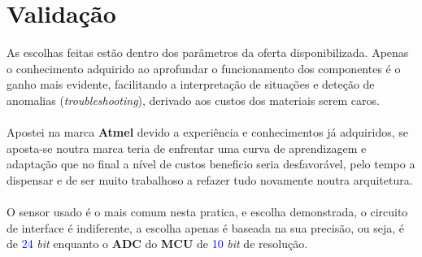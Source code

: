 \section{Validação}
As escolhas feitas estão dentro dos parâmetros da oferta disponibilizada. Apenas o conhecimento adquirido ao aprofundar o funcionamento dos componentes é o ganho mais evidente, facilitando a interpretação de situações e deteção de anomalias (\textit{troubleshooting}), derivado aos custos dos materiais serem caros.
\\
\\
Apostei na marca \textbf{Atmel} devido a experiência e conhecimentos já adquiridos, se aposta-se noutra marca teria de enfrentar uma curva de aprendizagem e adaptação que no final a nível de custos beneficio seria desfavorável, pelo tempo a dispensar e de ser muito trabalhoso a refazer tudo novamente noutra arquitetura.
\\
\\
O sensor usado é o mais comum nesta pratica, e escolha demonstrada, o circuito de interface é indiferente, a escolha apenas é baseada na sua precisão, ou seja, é de \textcolor{blue}{24} \textit{bit} enquanto o \textbf{ADC} do \textbf{MCU} de \textcolor{blue}{10} \textit{bit} de resolução.
\\
\\
